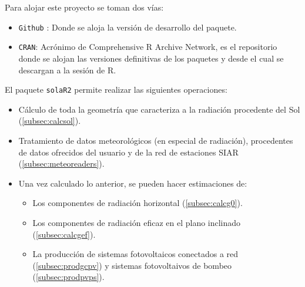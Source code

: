 Para alojar este proyecto se toman dos vías:
\begin{itemize}
\item \texttt{Github} \cite{github}: Donde se aloja la versión de desarrollo del paquete.
\item \texttt{CRAN}: Acrónimo de Comprehensive R Archive Network, es el repositorio donde se alojan las versiones definitivas de los paquetes y desde el cual se descargan a la sesión de R.
\end{itemize}

El paquete \texttt{solaR2} permite realizar las siguientes operaciones:
\begin{itemize}
\item Cálculo de toda la geometría que caracteriza a la radiación procedente del Sol (\ref{subsec:calcsol}).
\item Tratamiento de datos meteorológicos (en especial de radiación), procedentes de datos ofrecidos del usuario y de la red de estaciones SIAR \cite{siar23} (\ref{subsec:meteoreaders}).
\item Una vez calculado lo anterior, se pueden hacer estimaciones de:
\begin{itemize}
\item Los componentes de radiación horizontal (\ref{subsec:calcg0}).
\item Los componentes de radiación eficaz en el plano inclinado (\ref{subsec:calcgef}).
\item La producción de sistemas fotovoltaicos conectados a red (\ref{subsec:prodgcpv}) y sistemas fotovoltaivos de bombeo (\ref{subsec:prodpvps}).
\end{itemize}
\end{itemize}

